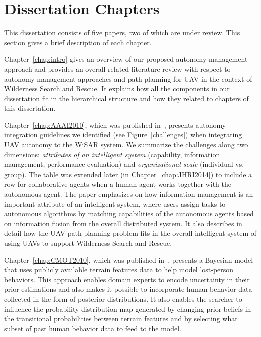 \section{Dissertation Chapters}

This dissertation consists of five papers, two of which are under review. This section gives a brief description of each chapter.

Chapter~\ref{chap:intro} gives an overview of our proposed autonomy management approach and provides an overall related literature review with respect to autonomy management approaches and path planning for UAV in the context of Wilderness Search and Rescue. It explains how all the components in our dissertation fit in the hierarchical structure and how they related to chapters of this dissertation.

Chapter~\ref{chap:AAAI2010}, which was published in~\cite{Lin2010Supporting}, presents autonomy integration guidelines we identified (see Figure~\ref{challenges}) when integrating UAV autonomy to the WiSAR system. We summarize the challenges along two dimensions: \textit{attributes of an intelligent system} (capability, information management, performance evaluation) and \textit{organizational scale} (individual vs. group). The table was extended later (in Chapter~\ref{chap:JHRI2014}) to include a row for collaborative agents when a human agent works together with the autonomous agent. The paper emphasizes on how information management is an important attribute of an intelligent system, where users assign tasks to autonomous algorithms by matching capabilities of the autonomous agents based on information fusion from the overall distributed system. It also describes in detail how the UAV path planning problem fits in the overall intelligent system of using UAVs to support Wilderness Search and Rescue.

Chapter~\ref{chap:CMOT2010}, which was published in~\cite{Lin2010Bayesian}, presents a Bayesian model that uses publicly available terrain features data to help model lost-person behaviors. This approach enables domain experts to encode uncertainty in their prior estimations and also makes it possible to incorporate human behavior data collected in the form of posterior distributions. It also enables the searcher to influence the probability distribution map generated by changing prior beliefs in the transitional probabilities between terrain features and by selecting what subset of past human behavior data to feed to the model.

